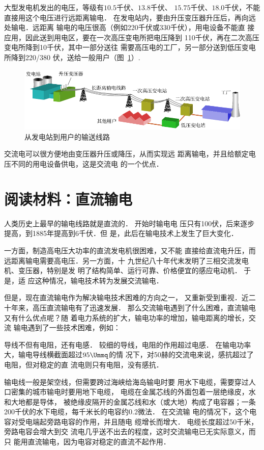 大型发电机发出的电压，等级有$10.5$千伏、$13.8$千伏、
$15.75$千伏、$18.0$千伏，不能直接用这个电压进行远距离输电．
在发电站内，要由升压变压器升压后，再向远处输电．远距离
输电的电压很高（例如220千伏或330千伏），用电设备不能直
接应用，因此送到用电区，要在一次高压变电所把电压降到
110千伏，再在二次高压变电所降到10千伏，其中一部分送往
需要高压电的工厂，另一部分送到低压变电所降到220/380
伏，送给一般用户（图~\ref{fig_C_3-30}）.
\begin{figure}[htbp]
    \centering
    \includegraphics{fig/C/3-30.pdf}
    \caption{从发电站到用户的输送线路}\label{fig_C_3-30}
\end{figure}

交流电可以很方便地由变压器升压或降压，从而实现远
距离输电，并且给额定电压不同的用电设备供电，这是交流电
的一个优点．

\section*{阅读材料：直流输电}
人类历史上最早的输电线路就是直流的．
开始时输电电
压只有100伏，后来逐步提高，到1885年提高到6千伏．但
是，此后在输电技术上发生了巨大变化．

一方面，制造高电压大功率的直流发电机很困难，又不能
直接给直流电升压，而远距离输电需要高电压．另一方面，十
九世纪八十年代末发明了三相交流发电机、变压器，特别是发
明了结构简单、运行可靠、价格便宜的感应电动机．
于是，适
应这种情况，输电技术转为发展交流输电．

但是，现在直流输电作为解决输电技术困难的方向之一，
又重新受到重视．近二十年来，高压直流输电有了迅速发展．
那么交流输电遇到了什么困难，直流输电又有什么优点呢？随
着电力系统的扩大，输电功率的增加，输电距离的增长，交流
输电遇到了一些技术困难，例如：

导线不但有电阻，还有电感．
较细的导线，电阻的作用超过电感．
在输电功率大，输电导线横截面超过$95 \Ummq $的情
况下，对50赫的交流电来说，感抗超过了电阻，但对稳定的直
流电则只有电阻，没有感抗．

输电线一般是架空线，但需要跨过海峡给海岛输电时要
用水下电缆，需要穿过人口密集的城市输电时要用地下电缆，
电缆在金属芯线的外面包着一层绝缘皮，水和大地都是导体，
被绝缘皮隔开的金属芯线和水（或大地）构成了电容器；一条
200千伏的水下电缆，每千米长的电容约0.2微法．
在交流输
电的情况下，这个电容对受电端起旁路电容的作用，并且随电
缆增长而增大．
电缆长度超过50千米，旁路电容会增大到交
流电几乎送不出去的程度，这时交流输电已无实际意义，而只
能用直流输电，因为电容对稳定的直流不起作用．

